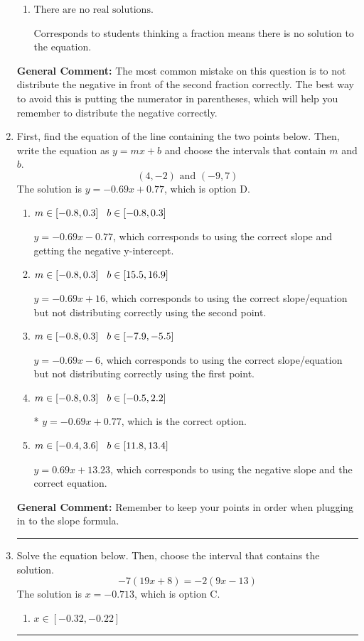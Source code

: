 \documentclass{extbook}[14pt]
\newcommand{\litem}[1]{\item #1

\rule{\textwidth}{0.4pt}}
\begin{document}
\begin{enumerate}
{\begin{enumerate}[label=\Alph*.]
* $x = -1.121$, which is the correct option.
\item \( \text{There are no real solutions.} \)

Corresponds to students thinking a fraction means there is no solution to the equation.
\end{enumerate}

\textbf{General Comment:} The most common mistake on this question is to not distribute the negative in front of the second fraction correctly. The best way to avoid this is putting the numerator in parentheses, which will help you remember to distribute the negative correctly.
}
\litem{
First, find the equation of the line containing the two points below. Then, write the equation as $ y=mx+b $ and choose the intervals that contain $m$ and $b$.
\[ (4, -2) \text{ and } (-9, 7) \]
The solution is \( y = -0.69x + 0.77 \), which is option D.\begin{enumerate}[label=\Alph*.]
\item \( m \in [-0.8, 0.3] \hspace*{3mm} b \in [-0.8, 0.3] \)

 $y = -0.69x -0.77$, which corresponds to using the correct slope and getting the negative y-intercept.
\item \( m \in [-0.8, 0.3] \hspace*{3mm} b \in [15.5, 16.9] \)

 $y = -0.69x + 16$, which corresponds to using the correct slope/equation but not distributing correctly using the second point.
\item \( m \in [-0.8, 0.3] \hspace*{3mm} b \in [-7.9, -5.5] \)

 $y = -0.69x -6$, which corresponds to using the correct slope/equation but not distributing correctly using the first point.
\item \( m \in [-0.8, 0.3] \hspace*{3mm} b \in [-0.5, 2.2] \)

* $y = -0.69x + 0.77$, which is the correct option.
\item \( m \in [-0.4, 3.6] \hspace*{3mm} b \in [11.8, 13.4] \)

 $y = 0.69x + 13.23$, which corresponds to using the negative slope and the correct equation.
\end{enumerate}

\textbf{General Comment:} Remember to keep your points in order when plugging in to the slope formula.
}
\litem{
Solve the equation below. Then, choose the interval that contains the solution.
\[ -7(19x + 8) = -2(9x -13) \]
The solution is \( x = -0.713 \), which is option C.\begin{enumerate}[label=\Alph*.]
\item \( x \in [-0.32, -0.22] \)


\end{enumerate}}
\end{enumerate}
\end{document}
